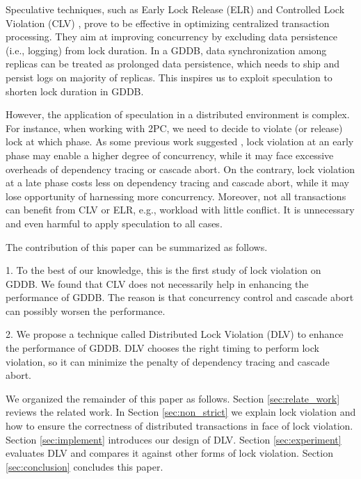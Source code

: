 \documentclass[conference]{IEEEtran}
\begin{document}
Speculative techniques, such as Early Lock Release (ELR) \cite{EfficientLocking:conf/vldb/KimuraGK12} and Controlled Lock Violation (CLV)
\cite{CLV:conf/sigmod/GraefeLKTV13}, prove to be effective in optimizing centralized transaction processing.
They aim at improving concurrency by excluding data persistence (i.e., logging) from lock duration.
In a GDDB, data synchronization among replicas can be treated as prolonged data persistence, which needs to ship and persist logs on majority of replicas.
This inspires us to exploit speculation to shorten lock duration in GDDB.

However, the application of speculation in a distributed environment is complex.
For instance, when working with 2PC, we need to decide to violate (or release) lock at which phase.
As some previous work suggested \cite{CLV:conf/sigmod/GraefeLKTV13}, lock violation at an early phase may enable a higher degree of concurrency,
while it may face excessive overheads of dependency tracing or cascade abort.
On the contrary, lock violation at a late phase costs less on dependency tracing and cascade abort,
while it may lose opportunity of harnessing more concurrency.
Moreover, not all transactions can benefit from CLV or ELR, e.g., workload with little conflict.
It is unnecessary and even harmful to apply speculation to all cases.

The contribution of this paper can be summarized as follows.

1. To the best of our knowledge, this is the first study of lock violation on GDDB.
We found that CLV does not necessarily help in enhancing the performance of GDDB.
The reason is that concurrency control and cascade abort can possibly worsen the performance.

2. We propose a technique called Distributed Lock Violation (DLV) to enhance the performance of GDDB.
DLV chooses the right timing to perform lock violation, so it can minimize the penalty of dependency tracing and cascade abort.

We organized the remainder of this paper as follows.
Section \ref{sec:relate_work} reviews the related work.
In Section \ref{sec:non_strict} we explain lock violation and how to ensure the correctness of distributed transactions in face of lock violation.
Section \ref{sec:implement} introduces our design of DLV.
Section \ref{sec:experiment} evaluates DLV and compares it against other forms of lock violation.
Section \ref{sec:conclusion} concludes this paper.
\end{document}

